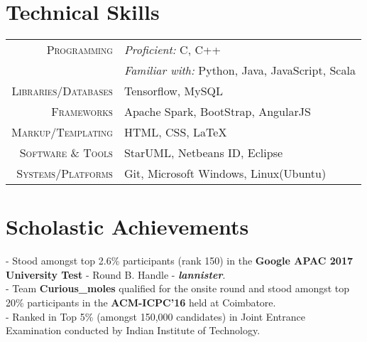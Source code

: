 \documentclass[a4paper,10pt]{extarticle} %
\begin{document}

\section{\large{Technical Skills}}

\begin{tabular}{r|p{16cm}}
\textsc{\normalsize{Programming}} 
& {\itshape{\small{Proficient:}}} \small{C, C++} \\
& {\itshape{\small{Familiar with:}}} \small{Python, Java, JavaScript, Scala} \\
\textsc{\normalsize{Libraries/Databases}} & \small{Tensorflow, MySQL}\\
\textsc{\normalsize{Frameworks}} & \small{Apache Spark, BootStrap, AngularJS}\\
\textsc{\normalsize{Markup/Templating}} & \small{HTML, CSS, \LaTeX}\\
\textsc{\normalsize{Software \& Tools}} & \small{StarUML, Netbeans ID, Eclipse}\\
\textsc{\normalsize{Systems/Platforms}} & \small{Git, Microsoft Windows, Linux(Ubuntu)}\\
\end{tabular}


\section{\large{Scholastic Achievements}}


\small{- Stood amongst top 2.6\% participants (rank 150) in the \textbf{Google APAC 2017 University Test} - Round B. Handle - \textbf{\textit{lannister}}}.\\
\small{- Team \textbf{\textbf{Curious\_moles}} qualified for the onsite round and stood amongst top 20\% participants in the \textbf{ACM-ICPC'16} held at Coimbatore.} \\
\small{- Ranked in Top 5\% (amongst 150,000 candidates) in Joint Entrance Examination conducted by Indian Institute of Technology.} 



\end{document}
